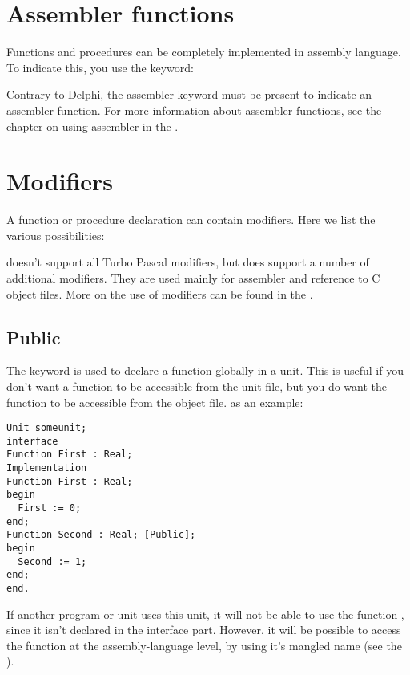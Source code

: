 \documentclass{report}
\begin{document}
\section{Assembler functions}
Functions and procedures can be completely implemented in assembly
language. To indicate this, you use the  keyword:

Contrary to Delphi, the assembler keyword must be present to indicate an
assembler function.
For more information about assembler functions, see the chapter on using
assembler in the \progref.


\section{Modifiers}
A function or procedure declaration can contain modifiers. Here we list the
various possibilities:

\fpc doesn't support all Turbo Pascal modifiers, but
does support a number of additional modifiers. They are used mainly for assembler and
reference to C object files. More on the use of modifiers can be found in
the \progref.
\subsection{Public}
The  keyword is used to declare a function globally in a unit.
This is useful if you don't want a function to be accessible from the unit
file, but you do want the function to be accessible from the object file.
as an example:
\begin{verbatim}
Unit someunit;
interface
Function First : Real;
Implementation
Function First : Real;
begin
  First := 0;
end;
Function Second : Real; [Public];
begin
  Second := 1;
end;
end.
\end{verbatim}
If another program or unit uses this unit, it will not be able to use the
function , since it isn't declared in the interface part.
However, it will be possible to access the function  at the
assembly-language level, by using it's mangled name (see the \progref).
\end{document}
